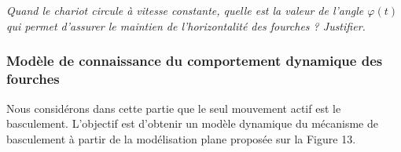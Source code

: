 \documentclass[10pt,fleqn]{article} %
\begin{document}
\subparagraph{}
\textit{Quand le chariot circule à vitesse constante, quelle est la valeur de l’angle $\varphi(t)$ qui permet d’assurer le maintien de l’horizontalité des fourches ? Justifier.}
%
%
%
%


\subsubsection*{Modèle de connaissance du comportement dynamique des fourches}

Nous considérons dans cette partie que le seul mouvement actif est le basculement.
L’objectif est d’obtenir un modèle dynamique du mécanisme de basculement à partir de la modélisation plane proposée sur la Figure 13.
\end{document}
